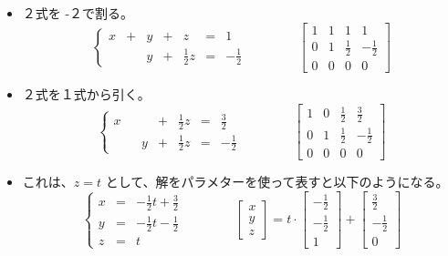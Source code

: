 \begin{itemize}
\item ２式を -２で割る。
$$\left\{\begin{array}{rrrrrrr}
x & + & y & + & z & = & 1\\
 & & y  & + & \frac12z & = & -\frac12
\end{array}\right. \qquad\qquad  
\left[\begin{array}{rrrr}
1 & 1 & 1 &  1\\
0 & 1 & \frac12 & -\frac12\\
0 & 0 & 0 & 0
\end{array}\right]$$
\item ２式を１式から引く。
$$\left\{\begin{array}{rrrrrrr}
x & &  & + & \frac12z & = & \frac32\\
 & & y  & + & \frac12z & = & -\frac12
\end{array}\right. \qquad\qquad  
\left[\begin{array}{rrrr}
1 & 0 & \frac12 &  \frac32\\
0 & 1 & \frac12 & -\frac12\\
0 & 0 & 0 & 0
\end{array}\right]$$
\item これは、$z = t$ として、解をパラメターを使って表すと以下のようになる。
$$\left\{\begin{array}{rcl}
x & = & -\frac12t + \frac32\\
y & = & -\frac12t - \frac12\\
z & = & t
\end{array}\right. \qquad\qquad  
\left[\begin{array}{r}
x \\ y \\ z 
\end{array}\right] =
t\cdot \left[\begin{array}{r}
-\frac12 \\ -\frac12 \\ 1
\end{array}\right]  + 
\left[\begin{array}{r}
\frac32 \\ -\frac12 \\ 0 
\end{array}\right] $$
\end{itemize}

